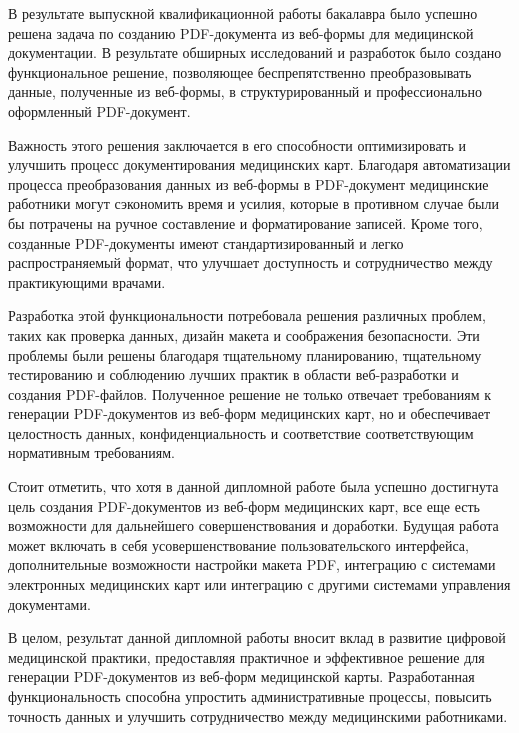 \conclusion
В результате выпускной квалификационной работы бакалавра было успешно решена задача по созданию PDF-документа из веб-формы для медицинской документации. В результате обширных исследований и разработок было создано функциональное решение, позволяющее беспрепятственно преобразовывать данные, полученные из веб-формы, в структурированный и профессионально оформленный PDF-документ.

Важность этого решения заключается в его способности оптимизировать и улучшить процесс документирования медицинских карт. Благодаря автоматизации процесса преобразования данных из веб-формы в PDF-документ медицинские работники могут сэкономить время и усилия, которые в противном случае были бы потрачены на ручное составление и форматирование записей. Кроме того, созданные PDF-документы имеют стандартизированный и легко распространяемый формат, что улучшает доступность и сотрудничество между практикующими врачами.

Разработка этой функциональности потребовала решения различных проблем, таких как проверка данных, дизайн макета и соображения безопасности. Эти проблемы были решены благодаря тщательному планированию, тщательному тестированию и соблюдению лучших практик в области веб-разработки и создания PDF-файлов. Полученное решение не только отвечает требованиям к генерации PDF-документов из веб-форм медицинских карт, но и обеспечивает целостность данных, конфиденциальность и соответствие соответствующим нормативным требованиям.

Стоит отметить, что хотя в данной дипломной работе была успешно достигнута цель создания PDF-документов из веб-форм медицинских карт, все еще есть возможности для дальнейшего совершенствования и доработки. Будущая работа может включать в себя усовершенствование пользовательского интерфейса, дополнительные возможности настройки макета PDF, интеграцию с системами электронных медицинских карт или интеграцию с другими системами управления документами.

В целом, результат данной дипломной работы вносит вклад в развитие цифровой медицинской практики, предоставляя практичное и эффективное решение для генерации PDF-документов из веб-форм медицинской карты. Разработанная функциональность способна упростить административные процессы, повысить точность данных и улучшить сотрудничество между медицинскими работниками.